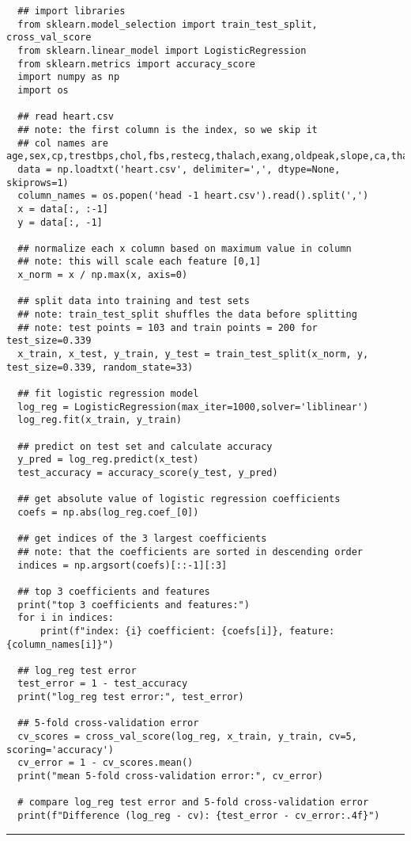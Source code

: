 \documentclass{article}
\begin{document}
\begin{lstlisting}
  ## import libraries
  from sklearn.model_selection import train_test_split, cross_val_score
  from sklearn.linear_model import LogisticRegression
  from sklearn.metrics import accuracy_score
  import numpy as np
  import os
  
  ## read heart.csv
  ## note: the first column is the index, so we skip it
  ## col names are age,sex,cp,trestbps,chol,fbs,restecg,thalach,exang,oldpeak,slope,ca,thal,target
  data = np.loadtxt('heart.csv', delimiter=',', dtype=None, skiprows=1)
  column_names = os.popen('head -1 heart.csv').read().split(',')
  x = data[:, :-1]
  y = data[:, -1]
  
  ## normalize each x column based on maximum value in column
  ## note: this will scale each feature [0,1]
  x_norm = x / np.max(x, axis=0)
  
  ## split data into training and test sets
  ## note: train_test_split shuffles the data before splitting
  ## note: test points = 103 and train points = 200 for test_size=0.339
  x_train, x_test, y_train, y_test = train_test_split(x_norm, y, test_size=0.339, random_state=33)
  
  ## fit logistic regression model
  log_reg = LogisticRegression(max_iter=1000,solver='liblinear')
  log_reg.fit(x_train, y_train)
  
  ## predict on test set and calculate accuracy
  y_pred = log_reg.predict(x_test)
  test_accuracy = accuracy_score(y_test, y_pred)
  
  ## get absolute value of logistic regression coefficients
  coefs = np.abs(log_reg.coef_[0])
  
  ## get indices of the 3 largest coefficients
  ## note: that the coefficients are sorted in descending order
  indices = np.argsort(coefs)[::-1][:3]
  
  ## top 3 coefficients and features
  print("top 3 coefficients and features:")
  for i in indices:
      print(f"index: {i} coefficient: {coefs[i]}, feature: {column_names[i]}")
  
  ## log_reg test error 
  test_error = 1 - test_accuracy
  print("log_reg test error:", test_error)
  
  ## 5-fold cross-validation error 
  cv_scores = cross_val_score(log_reg, x_train, y_train, cv=5, scoring='accuracy')
  cv_error = 1 - cv_scores.mean()
  print("mean 5-fold cross-validation error:", cv_error)
  
  # compare log_reg test error and 5-fold cross-validation error 
  print(f"Difference (log_reg - cv): {test_error - cv_error:.4f}")
\end{lstlisting}

\noindent\rule{\textwidth}{0.4pt}\\
\end{document}
